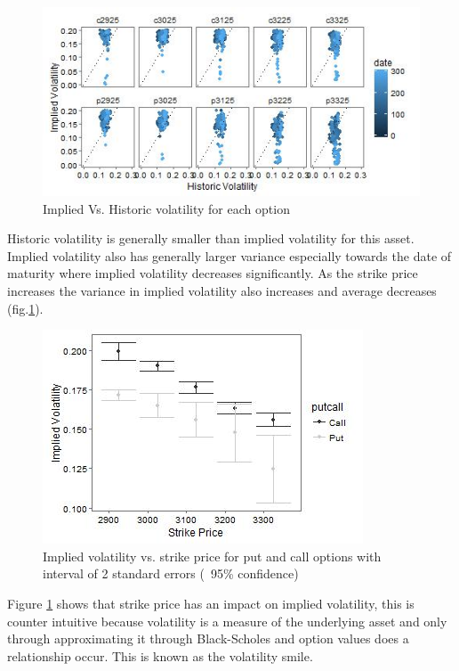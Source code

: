 \documentclass{sig-alternate-05-2015}
\begin{document}
\begin{figure}[ht]
	\includegraphics[width=\linewidth]{../Plots/Q3_1.jpg}
	\centering
	\caption{Implied Vs. Historic volatility for each option}
			\label{fig:Q3_1}
\end{figure}

Historic volatility is generally smaller than implied volatility for this asset. Implied volatility also has generally larger variance especially towards the date of maturity where implied volatility decreases significantly. As the strike price increases the variance in implied volatility also increases and average decreases (fig.\ref{fig:Q3_1}). 

\begin{figure}[h]
\includegraphics[width=0.8\linewidth]{../Plots/Q3_2.jpg}
\centering
\caption{Implied volatility vs. strike price for put and call options with interval of 2 standard errors (~95\% confidence)}
\label{fig:Q3_2}
\end{figure} 

Figure \ref{fig:Q3_1} shows that strike price has an impact on implied volatility, this is counter intuitive because volatility is a measure of the underlying asset and only through approximating it through Black-Scholes and option values does a relationship occur. This is known as the volatility smile. 
\end{document}
